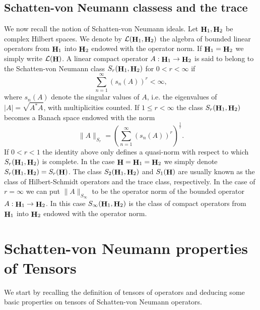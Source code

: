 \documentclass[a4paper,12pt,reqno]{amsart}
\theoremstyle{definition}
\theoremstyle{remark}
\numberwithin{equation}{section}
\DeclareMathOperator{\Hi}{{\bf H}}
\begin{document}
\subsection{Schatten-von Neumann classess and the trace}
We now recall the notion of Schatten-von Neumann ideals. Let  $\Hi_1,\Hi_2$ be  complex Hilbert spaces. We denote by $\mathcal{L}(\Hi_1, \Hi_2)$ the algebra of bounded linear operators from $\Hi_1$ into $\Hi_2$ endowed with the operator norm. If $\Hi_1=\Hi_2$ we simply write $\mathcal{L}(\Hi)$. A linear compact operator $A:\Hi_1\rightarrow \Hi_2$ is said to belong to the Schatten-von Neumann class $S_r(\Hi_1,\Hi_2)$ for $0<r<\infty$ if 
$$\sum\limits_{n=1}^{\infty}(s_n(A))^r<\infty,$$ 
where $s_n(A)$ denote the singular values of $A$, i.e. the eigenvalues of $|A|=\sqrt{A^*A}$,  
with multiplicities counted. If $1\leq r<\infty$ 
the class $S_r(\Hi_1,\Hi_2)$ becomes a Banach space endowed with the norm 
\[\|A\|_{S_r}=\left(\sum\limits_{n=1}^{\infty}(s_n(A))^r\right)^{\frac{1}{r}}.\]
If $0<r<1$ the identity above only defines a quasi-norm with respect to which $S_r(\Hi_1,\Hi_2)$ is complete. In  the case $\Hi=\Hi_1=\Hi_2$ we simply denote $S_r(\Hi_1,\Hi_2)=S_r(\Hi)$. The class $S_2(\Hi_1,\Hi_2)$ and $S_1(\Hi)$ are usually known as the class of Hilbert-Schmidt operators and the trace class, respectively. In the case of $r=\infty$ we can put $\|A\|_{S_{\infty}}$ to be the operator norm of the bounded operator
$A:\Hi_1\to \Hi_2$. In this case  $S_{\infty}(\Hi_1,\Hi_2)$ is the class of compact operators from 
 $\Hi_1$ into $\Hi_2$ endowed with the operator norm.\\



\section{Schatten-von Neumann properties of Tensors }\label{sec3}
 We start by recalling the definition of tensors of operators and deducing some basic properties on tensors of Schatten-von Neumann operators.
 
\end{document}
